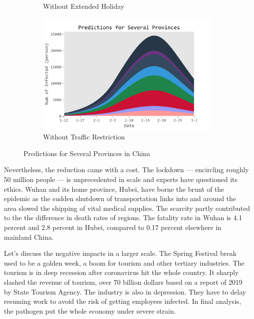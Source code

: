 \documentclass[12pt]{mcmthesis}
\begin{document}
\begin{figure}[H]
\begin{subfigure}[b]{0.3\textwidth}
        \caption{\small{Without Extended Holiday}}
        \label{fig:Stack_No_Holiday}
    \end{subfigure}%
    \begin{subfigure}[b]{0.3\textwidth}
        \includegraphics[width=\textwidth]{figure/Stack_Province_No_Geo_Restriction.png}
        \caption{\small{Without Traffic Restriction}}
        \label{fig:Stack_No_Tra_Rest}
    \end{subfigure}
    
    \caption{Predictions for Several Provinces in China}\label{fig:Stack}
\end{figure}

    Nevertheless, the reduction came with a cost. The lockdown --- encircling roughly 50 million people --- is unprecedented in scale and experts have questioned its ethics. Wuhan and its home province, Hubei, have borne the brunt of the epidemic as the sudden shutdown of transportation links into and around the area slowed the shipping of vital medical supplies. The scarcity partly contributed to the the difference in death rates of regions. The fatality rate in Wuhan is 4.1 percent and 2.8 percent in Hubei, compared to  0.17 percent elsewhere in mainland China. 
    
    Let's discuss the negative impacts in a larger scale. The Spring Festival break used to be a golden week, a boom for tourism and other tertiary industries. The tourism is in deep recession after coronavirus hit the whole country. It sharply slashed the revenue of tourism, over 70 billion dollars based on a report of 2019 by State Tourism Agency. The industry is also in depression. They have to delay resuming work to avoid the risk of getting employees infected. In final analysis, the pathogen put the whole economy under severe strain.
\end{document}
